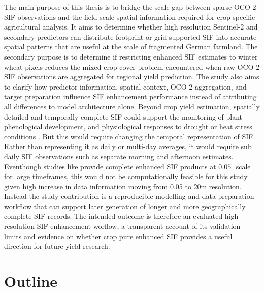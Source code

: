 The main purpose of this thesis is to bridge the scale gap between sparse OCO-2 SIF observations and the field scale spatial information required for crop specific agricultural analysis. It aims to determine whether high resolution Sentinel-2 and secondary predictors can distribute footprint or grid supported SIF into accurate spatial patterns that are useful at the scale of fragmented German farmland. The secondary purpose is to determine if restricting enhanced SIF estimates to winter wheat pixels reduces the mixed crop cover problem encountered when raw OCO-2 SIF observations are aggregated for regional yield prediction. The study also aims to clarify how predictor information, spatial context, OCO-2 aggregation, and target preparation influence SIF enhancement performance instead of attributing all differences to model architecture alone. Beyond crop yield estimation, spatially detailed and temporally complete SIF could support the monitoring of plant phenological development, and physiological responses to drought or heat stress conditions \cite{song2018satellite}. But this would require changing the temporal representation of SIF. Rather than representing it as daily or multi-day averages, it would require sub daily SIF observations such as separate morning and afternoon estimates. Eventhough studies like \cite{li2019global, ma2020generation, yu2019high} provide complete enhanced SIF products at \(0.05^\circ\) scale for large timeframes, this would not be computationally feasible for this study given high increase in data information moving from 0.05 to 20m resolution. Instead the study contribution is a reproducible modelling and data preparation workflow that can support later generation of longer and more geographically
complete SIF records. The intended outcome is therefore an evaluated high resolution SIF enhancement worflow, a transparent account of its validation limits and evidence on whether crop pure enhanced SIF provides a useful direction for future yield research.

\section{Outline\label{sec:outline}}

